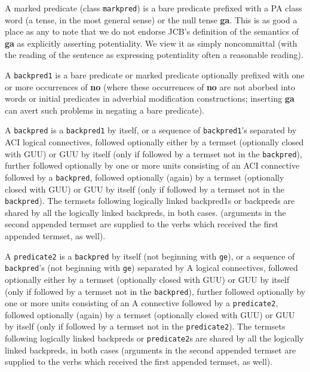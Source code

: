 \documentclass[12pt]{book}
\begin{document}
A marked predicate (class {\tt markpred}) is a bare predicate prefixed with a PA class word (a tense, in the most general sense) or the null tense {\bf ga}.
This is as good a place as any to note that we do not endorse JCB's definition of the semantics of {\bf ga} as explicitly asserting potentiality.  We view it as simply noncommittal (with the reading of the sentence as expressing potentiality often a reasonable reading).

A {\tt backpred1} is a bare predicate or marked predicate optionally prefixed with one or more occurrences of {\bf no} (where these occurrences of {\bf no} are not aborbed into words or initial predicates in adverbial modification constructions;  inserting {\bf ga} can avert such problems in negating a bare predicate).

A {\tt backpred} is a {\tt backpred1} by itself, or a sequence of {\tt backpred1}'s separated by ACI logical connectives, followed optionally either
by a termset (optionally closed with GUU) or GUU by itself (only if followed by a termset not in the {\tt backpred}), further followed optionally by one or more units consisting of an ACI connective followed by a {\tt backpred}, followed optionally (again) by a termset (optionally closed with GUU) or GUU by itself (only if followed by a termset not in the {\tt backpred}).  The termsets following logically linked backpred1s or backpreds are shared by all the logically linked backpreds, in both cases.   (arguments in the second appended termset are supplied to the verbs which received the first appended termset, as well).

A {\tt predicate2} is a {\tt backpred} by itself (not beginning with {\tt ge}), or a sequence of {\tt backpred}'s (not beginning with {\tt ge}) separated by A logical connectives, followed optionally either
by a termset (optionally closed with GUU) or GUU by itself (only if followed by a termset not in the {\tt backpred}), further followed optionally by one or more units consisting of an A connective followed by a {\tt predicate2}, followed optionally (again) by a termset (optionally closed with GUU) or GUU by itself (only if followed by a termset not in the {\tt predicate2}).  The termsets following logically linked backpreds or {\tt predicate2}s are shared by all the logically linked backpreds, in both cases (arguments in the second appended termset are supplied to the verbs which received the first appended termset, as well).
\end{document}
